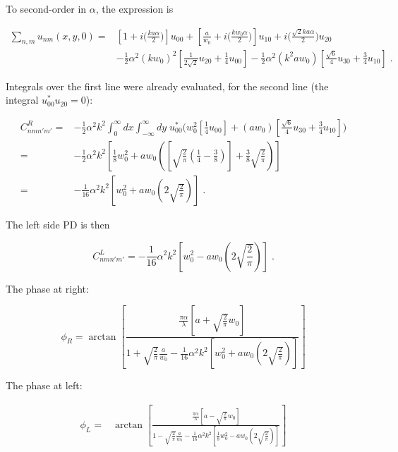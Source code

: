 \documentclass[aps,twoside,secnumarabic,balancelastpage,amsmath,amssymb,nofootinbib,hyperref=pdftex]{revtex4}
\newcommand{\bigfrac}[2]{\Big( \frac{#1}{#2}\Big)}
\begin{document}
To second-order in $\alpha$, the expression is

	\begin{align*}
		\sum_{n,m} u_{nm}(x,y,0)=&
			\left[
				1+
				i \bigfrac{ k a \alpha}{ 2}
			\right]
			u_{00}
			+
			\left[
			\frac{a}{w_{0}}		
			+
			i  \bigfrac{k w_{0} \alpha}{2}	
			\right]			
			u_{10}
			+
			i  
				\bigfrac{\sqrt{2} k a \alpha}{ 2}
			u_{20}
			\\  &
	- \frac{1}{2}\alpha^2  (k w_0)^2 
		[ \frac{1}{2 \sqrt{2}} u_{20}
		+
		\frac{1}{4} u_{00}
		]	
		-\frac{1}{2}
		\alpha^2  (k^2 a w_0)
	[	
	 \frac{ \sqrt{6}} {4} u_{30}
	+ \frac{3}{4} u_{10}
	]
				 \; .
	\end{align*}

Integrals over the first line were already evaluated, for the second line (the integral $u_{00}^* u_{20} =0$):

\begin{align*}
C_{nmn'm'}^{R} =& 
-\frac{1}{2}
\alpha^2 k^2
\int_{0}^{\infty} dx\int_{-\infty}^{\infty}  dy \;
u_{00}^* \big(
	  w_0^2 
		[
		\frac{1}{4} u_{00}
		]	
		+ ( a w_0)
	[	
	 \frac{ \sqrt{6}} {4} u_{30}
	+ \frac{3}{4} u_{10}
	]
	\big)
	\\ =&
	-\frac{1}{2}\alpha^2 k^2 
	[
	 \frac{1}{8} w_0^2
	+ 
	a w_0(
	[
	\sqrt{\frac{2}{\pi}}
		(
		\frac{1}{4}
		-
		\frac{3}{8}
		)
	]
	+
	\frac{3}{8}
	\sqrt{\frac{2}{\pi}}
	)
	]
		\\ =&
	-\frac{1}{16}\alpha^2 k^2 
	[
	 w_0^2
	+ 
	a w_0(
	2
	\sqrt{\frac{2}{\pi}}
	)
	]
				 \; .
\end{align*}

The left side PD is then

\begin{equation*}
C_{nmn'm'}^{L} =
	-\frac{1}{16}
	\alpha^2 k^2 
	[
	  w_0^2
	- 
	a w_0(
	2
	\sqrt{\frac{2}{\pi}}
	)
	]
				 \; .
\end{equation*}

The phase at right:

\begin{equation*}
	\phi_R = 		
			\arctan
				\left[
					\frac
					{ \frac{\pi \alpha}{\lambda}
					\left[
						a 
						+
						\sqrt{\frac{2}{\pi}} w_0
					\right]}					
				{1
				+
				 \sqrt{\frac{2}{\pi}} \frac{a}{w_0}
				 		-\frac{1}{16}\alpha^2 k^2 
	[
	 w_0^2
	+ 
	a w_0(
		2
	\sqrt{\frac{2}{\pi}}
	)
	]			 
				 }
				\right]
\end{equation*}

The phase at left:

\begin{align*}
	\phi_L =&
			\arctan
				\left[
					\frac
					{ \frac{\pi \alpha}{\lambda}
					\left[
						a 
						-
						\sqrt{\frac{2}{\pi}} w_0
					\right]}					
				{1
				-
				 \sqrt{\frac{2}{\pi}} \frac{a}{w_0}
	-\frac{1}{16}
	\alpha^2 k^2 
	[
	 \frac{1}{8} w_0^2
	- 
	a w_0(
	2
	\sqrt{\frac{2}{\pi}}
	)
	]			 
				 }
				\right]
\end{align*}
\end{document}
